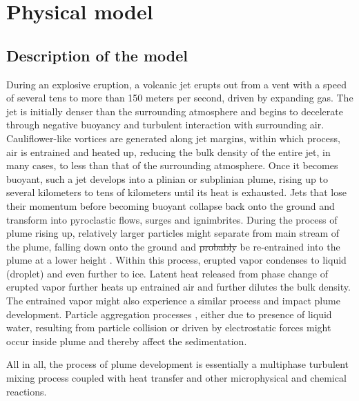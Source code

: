 \documentclass[gmd, manuscript]{copernicus} %
\providecommand{\DIFadd}[1]{{\protect\color{blue}\uwave{#1}}} %
\providecommand{\DIFdel}[1]{{\protect\color{red}\sout{#1}}}                      %
\providecommand{\DIFaddbegin}{} %
\providecommand{\DIFaddend}{} %
\providecommand{\DIFdelbegin}{} %
\providecommand{\DIFdelend}{} %
\begin{document}
\section{Physical model} \label{sec:physics-model}
\subsection{Description of the model}
During an explosive eruption, a volcanic jet erupts out from a vent with a speed of several tens to more than 150 meters per second, driven by expanding gas. The jet is initially denser than the surrounding atmosphere and begins to decelerate through negative buoyancy and turbulent interaction with surrounding air. Cauliflower-like vortices are generated along jet margins, within which process, air is entrained and heated up, reducing the bulk density of the entire jet, in many cases, to less than that of the surrounding atmosphere. Once it becomes buoyant, such a jet develops into a plinian or subplinian plume, rising up to several kilometers to tens of kilometers until its heat is exhausted. Jets that lose their momentum before becoming buoyant collapse back onto the ground and transform into pyroclastic flows, surges and ignimbrites. During the process of plume rising up, relatively larger particles might separate from main stream of the plume, falling down onto the ground and \DIFdelbegin \DIFdel{probably }\DIFdelend \DIFaddbegin \DIFadd{possibly }\DIFaddend be re-entrained into the plume at a lower height \citep{ernst1996sedimentation}. Within this process, erupted vapor condenses to liquid (droplet) and even further to ice. Latent heat released from phase change of erupted vapor  further heats up entrained air and further dilutes the bulk density. The entrained vapor might also experience a similar process and impact plume development. Particle aggregation processes \citep{carey1982influence,taddeucci2011aggregation}, either due to presence of liquid water, resulting from particle collision or driven by electrostatic forces might occur inside plume and thereby affect the sedimentation. 

All in all, the process of plume development is  essentially a multiphase turbulent mixing process coupled with heat transfer and other microphysical and chemical reactions.
\end{document}

